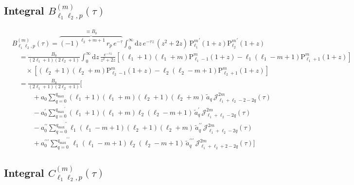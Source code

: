 \documentclass[10pt]{article}
\newcommand{\e}{e}    %
\newcommand{\Plm}[2]{{\text{P}_{#1}^{#2}}}
\newcommand{\sep}{\quad}
\newcommand{\qmax}{{q_\text{max}}}
\begin{document}
\subsection{Integral $B_{\ell_1\ell_2,p}^{(m)}(\tau)$}

\begin{align}
\nonumber
&B_{\ell_1\ell_2,p}^{(m)}(\tau) = \overbrace{(-1)^{\ell_2+m+1} \, r_p \, \e^{-\tau}}^{\equiv B_0} \int_0^\infty \mathrm{d}z \, \e^{-\tau z} \, (z^2+2z) \, \Plm{\ell_1}{m}^\prime(1+z) \Plm{\ell_2}{m}^\prime(1+z) \\
\nonumber
&\sep = \frac{B_0}{(2\ell_1+1)(2\ell_2+1)} \int_0^\infty \mathrm{d}z \, \frac{\e^{-\tau z}}{z^2+2z} \left[ (\ell_1+1)(\ell_1+m)\Plm{\ell_1-1}{m}(1+z) - \ell_1(\ell_1-m+1)\Plm{\ell_1+1}{m}(1+z) \right] \\
\nonumber
& \sep\sep \times \left[ (\ell_2+1)(\ell_2+m)\Plm{\ell_2-1}{m}(1+z) - \ell_2(\ell_2-m+1)\Plm{\ell_2+1}{m}(1+z) \right] \\
\nonumber
&\sep = \frac{B_0}{(2\ell_1+1)(2\ell_2+1)} \Bigg[ \\
\nonumber
   &\sep\sep\sep +a_0                      \sum_{q=0}^\qmax                        (\ell_1+1)(\ell_1+m)(\ell_2+1)(\ell_2+m) \, \tilde a_q \, \mathcal{J}_{\ell_1+\ell_2-2-2q}^{2m}(\tau) \\
\nonumber
   &\sep\sep\sep -a_0^\prime               \sum_{q=0}^{\qmax^\prime}               (\ell_1+1)(\ell_1+m)\ell_2(\ell_2-m+1)   \, \tilde a_q^\prime \, \mathcal{J}_{\ell_1+\ell_2-2q}^{2m}(\tau) \\
\nonumber
   &\sep\sep\sep -a_0^{\prime\prime}       \sum_{q=0}^{\qmax^{\prime\prime}}       \ell_1(\ell_1-m+1)(\ell_2+1)(\ell_2+m)   \, \tilde a_q^{\prime\prime} \, \mathcal{J}_{\ell_1+\ell_2-2q}^{2m}(\tau) \\
   &\sep\sep\sep +a_0^{\prime\prime\prime} \sum_{q=0}^{\qmax^{\prime\prime\prime}} \ell_1(\ell_1-m+1)\ell_2(\ell_2-m+1)     \, \tilde a_q^{\prime\prime\prime} \, \mathcal{J}_{\ell_1+\ell_2+2-2q}^{2m}(\tau) \Bigg]
\end{align}


\subsection{Integral $C_{\ell_1\ell_2,p}^{(m)}(\tau)$}
\end{document}
